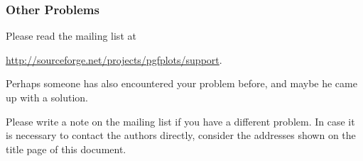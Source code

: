 \subsubsection{Other Problems}
Please read the mailing list at

\url{http://sourceforge.net/projects/pgfplots/support}.

\noindent Perhaps someone has also encountered your problem before, and maybe he came up with a solution.

Please write a note on the mailing list if you have a different problem. In case it is necessary to contact the authors directly, consider the addresses shown on the title page of this document.
